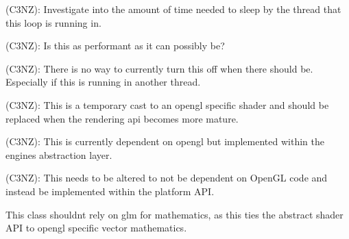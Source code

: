 
\begin{DoxyRefList}
\item[Member \mbox{\hyperlink{classlambda_1_1core_1_1io_1_1EventLoop_a00fd46aae12da78a44086ab1247d5629}{lambda\+::core\+::io\+::Event\+Loop\+::Run}} ()]\label{todo__todo000001}%
%
(C3\+NZ)\+: Investigate into the amount of time needed to sleep by the thread that this loop is running in. 

(C3\+NZ)\+: Is this as performant as it can possibly be? 

(C3\+NZ)\+: There is no way to currently turn this off when there should be. Especially if this is running in another thread.  
\item[Member \mbox{\hyperlink{classlambda_1_1core_1_1renderer_1_1Renderer_aebe538ed30fd76b4b918b8ca03c0765c}{lambda\+::core\+::renderer\+::Renderer\+::Submit}} (core\+::memory\+::\+Shared$<$ Vertex\+Array $>$ vertex\+\_\+array, core\+::memory\+::\+Shared$<$ Shader $>$ shader, const glm\+::mat4 \&transform=glm\+::mat4(1.\+0f))]\label{todo__todo000002}%
%
(C3\+NZ)\+: This is a temporary cast to an opengl specific shader and should be replaced when the rendering api becomes more mature.  
\item[Member \mbox{\hyperlink{classlambda_1_1core_1_1renderer_1_1Renderer2D_add05f542bc7bd929ada2b74118a54762}{lambda\+::core\+::renderer\+::Renderer2D\+::Init}} ()]\label{todo__todo000003}%
%
(C3\+NZ)\+: This is currently dependent on opengl but implemented within the engines abstraction layer.  
\item[Member \mbox{\hyperlink{classlambda_1_1core_1_1renderer_1_1Renderer2D_a3010ab7bc0ee09cccc62a1cfe9c5b86d}{lambda\+::core\+::renderer\+::Renderer2D\+::Begin\+Scene}} (const \mbox{\hyperlink{classlambda_1_1core_1_1renderer_1_1OrthographicCamera}{Orthographic\+Camera}} \&camera)]\label{todo__todo000004}%
%
(C3\+NZ)\+: This needs to be altered to not be dependent on Open\+GL code and instead be implemented within the platform A\+PI.  
\item[Class \mbox{\hyperlink{classlambda_1_1core_1_1renderer_1_1Shader}{lambda\+::core\+::renderer\+::Shader}} ]\label{todo__todo000005}%
%
This class shouldn\textquotesingle{}t rely on glm for mathematics, as this ties the abstract shader A\+PI to opengl specific vector mathematics. 
\end{DoxyRefList}